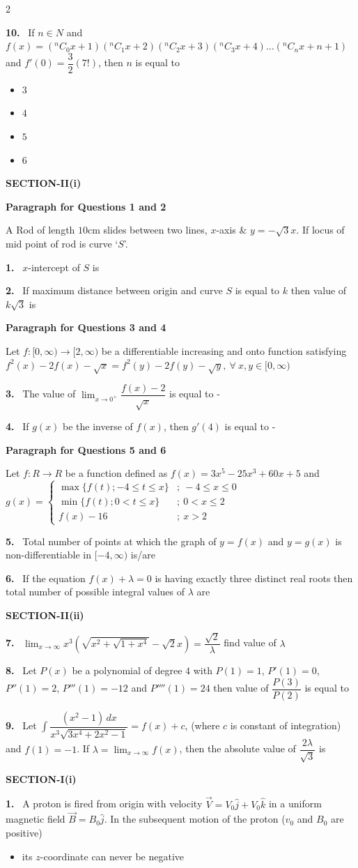 \documentclass[10pt]{extarticle}
\newcommand{\papersec}[1]{\par\bigskip{\centering\Large\bfseries PAPER-#1\par}\medskip}
\newcommand{\partsec}[2]{\par\medskip\noindent{\large\bfseries PART-#1: #2}\par\smallskip}
\newcommand{\sect}[1]{\par\smallskip\noindent\textbf{#1}\par}
\newcommand{\qn}[1]{\par\smallskip\noindent\textbf{#1.}~}
\newcommand{\paraq}[2]{\par\smallskip\noindent\textbf{Paragraph for Questions #1 and #2}\par}
\newenvironment{qoptions}{\begin{itemize}[leftmargin=1.8em,itemsep=1pt,topsep=2pt,label={}]}{\end{itemize}}
\newcommand{\opt}[2]{\item[(#1)] #2}
\begin{document}
\begin{multicols}{2}
\begin{qoptions}
\end{qoptions}
\qn{10} If $n\in N$ and $f(x)=({}^nC_0x+1)({}^nC_1x+2)({}^nC_2x+3)({}^nC_3x+4)\ldots({}^nC_nx+n+1)$ and $f'(0)=\dfrac32(7!)$, then $n$ is equal to
\begin{qoptions}
\opt{A}{$3$}
\opt{B}{$4$}
\opt{C}{$5$}
\opt{D}{$6$}
\end{qoptions}
\sect{SECTION-II(i)}
\paraq{1}{2}
A Rod of length $10$cm slides between two lines, $x$-axis \& $y=-\sqrt3x$. If locus of mid point of rod is curve `$S$'.
\qn{1} $x$-intercept of $S$ is
\qn{2} If maximum distance between origin and curve $S$ is equal to $k$ then value of $k\sqrt3$ is
\paraq{3}{4}
Let $f:[0,\infty)\to[2,\infty)$ be a differentiable increasing and onto function satisfying\\
$f^2(x)-2f(x)-\sqrt x=f^2(y)-2f(y)-\sqrt y,\ \forall\ x,y\in[0,\infty)$
\qn{3} The value of $\displaystyle\lim_{x\to0^+}\dfrac{f(x)-2}{\sqrt x}$ is equal to -
\qn{4} If $g(x)$ be the inverse of $f(x)$, then $g'(4)$ is equal to -
\paraq{5}{6}
Let $f:R\to R$ be a function defined as $f(x)=3x^5-25x^3+60x+5$ and\\
$g(x)=\begin{cases}\max\{f(t);-4\le t\le x\} & ;\ -4\le x\le0\\ \min\{f(t);0<t\le x\} & ;\ 0<x\le2\\ f(x)-16 & ;\ x>2\end{cases}$
\qn{5} Total number of points at which the graph of $y=f(x)$ and $y=g(x)$ is non-differentiable in $[-4,\infty)$ is/are
\qn{6} If the equation $f(x)+\lambda=0$ is having exactly three distinct real roots then total number of possible integral values of $\lambda$ are
\sect{SECTION-II(ii)}
\qn{7} $\displaystyle\lim_{x\to\infty}x^3\left(\sqrt{x^2+\sqrt{1+x^4}}-\sqrt2x\right)=\dfrac{\sqrt2}{\lambda}$ find value of $\lambda$
\qn{8} Let $P(x)$ be a polynomial of degree $4$ with $P(1)=1$, $P'(1)=0$, $P''(1)=2$, $P'''(1)=-12$ and $P''''(1)=24$ then value of $\dfrac{P(3)}{P(2)}$ is equal to
\qn{9} Let $\displaystyle\int\dfrac{(x^2-1)\,dx}{x^3\sqrt{3x^4+2x^2-1}}=f(x)+c$, (where $c$ is constant of integration) and $f(1)=-1$. If $\lambda=\displaystyle\lim_{x\to\infty}f(x)$, then the absolute value of $\dfrac{2\lambda}{\sqrt3}$ is
\raggedcolumns
\papersec{2}
\partsec{1}{PHYSICS}
\sect{SECTION-I(i)}
\qn{1} A proton is fired from origin with velocity $\vec V=V_0\hat j+V_0\hat k$ in a uniform magnetic field $\vec B=B_0\hat j$. In the subsequent motion of the proton ($v_0$ and $B_0$ are positive)
\begin{qoptions}
\opt{A}{its $z$-coordinate can never be negative}

\end{qoptions}
\end{multicols}
\end{document}

